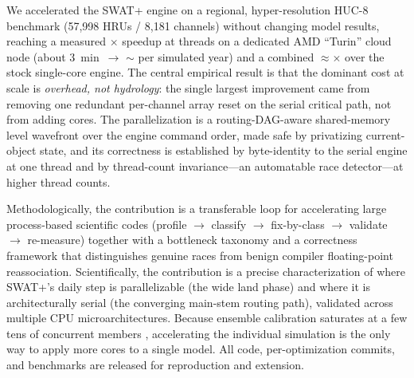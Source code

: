 We accelerated the SWAT+ engine on a regional, hyper-resolution HUC-8 benchmark (57{,}998
HRUs / 8{,}181 channels) without changing model results, reaching a measured \parHead$\times$
speedup at \parHeadN{} threads on a dedicated AMD ``Turin'' cloud node (about 3~min~$\rightarrow$
$\sim$\totMinutes{} per simulated year) and a combined $\approx$\totHead$\times$ over the stock
single-core engine. The central empirical result is that the dominant cost at scale is
\emph{overhead, not hydrology}: the single largest improvement came from removing one redundant
per-channel array reset on the serial critical path, not from adding cores. The parallelization is a
routing-DAG-aware shared-memory level wavefront over the engine command order, made safe by
privatizing current-object state, and its correctness is established by byte-identity to the serial
engine at one thread and by thread-count invariance---an automatable race detector---at higher
thread counts.

Methodologically, the contribution is a transferable loop for accelerating large process-based
scientific codes (profile $\rightarrow$ classify $\rightarrow$ fix-by-class $\rightarrow$
validate $\rightarrow$ re-measure) together with a bottleneck taxonomy and a correctness
framework that distinguishes genuine races from benign compiler floating-point reassociation.
Scientifically, the contribution is a precise characterization of where SWAT+'s daily step is
parallelizable (the wide land phase) and where it is architecturally serial (the converging
main-stem routing path), validated across multiple CPU microarchitectures. Because ensemble
calibration saturates at a few tens of concurrent members \citep{Rafiei2022Calibration},
accelerating the individual simulation is the only way to apply more cores to a single model. All
code, per-optimization commits, and benchmarks are released for reproduction and extension.
